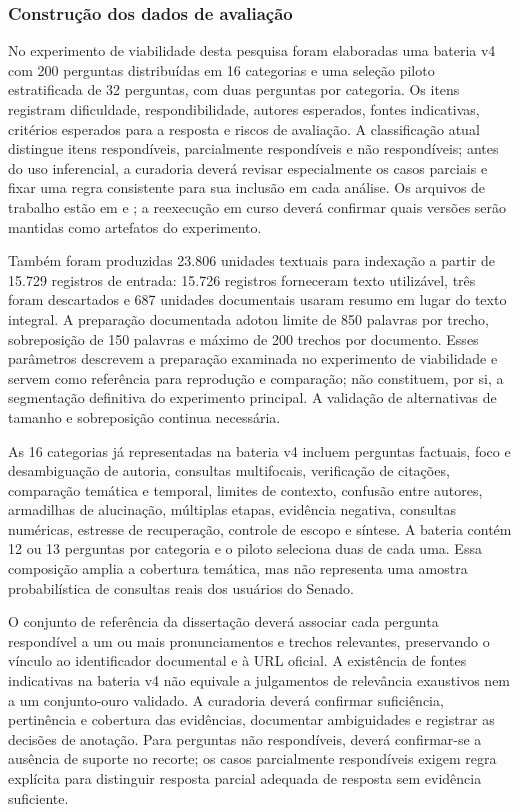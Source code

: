 \subsubsection{Construção dos dados de avaliação}

No experimento de viabilidade desta pesquisa foram elaboradas uma bateria v4 com 200 perguntas distribuídas em 16 categorias e uma seleção piloto estratificada de 32 perguntas, com duas perguntas por categoria. Os itens registram dificuldade, respondibilidade, autores esperados, fontes indicativas, critérios esperados para a resposta e riscos de avaliação. A classificação atual distingue itens respondíveis, parcialmente respondíveis e não respondíveis; antes do uso inferencial, a curadoria deverá revisar especialmente os casos parciais e fixar uma regra consistente para sua inclusão em cada análise. Os arquivos de trabalho estão em  e ; a reexecução em curso deverá confirmar quais versões serão mantidas como artefatos do experimento.

Também foram produzidas 23.806 unidades textuais para indexação a partir de 15.729 registros de entrada: 15.726 registros forneceram texto utilizável, três foram descartados e 687 unidades documentais usaram resumo em lugar do texto integral. A preparação documentada adotou limite de 850 palavras por trecho, sobreposição de 150 palavras e máximo de 200 trechos por documento. Esses parâmetros descrevem a preparação examinada no experimento de viabilidade e servem como referência para reprodução e comparação; não constituem, por si, a segmentação definitiva do experimento principal. A validação de alternativas de tamanho e sobreposição continua necessária.

As 16 categorias já representadas na bateria v4 incluem perguntas factuais, foco e desambiguação de autoria, consultas multifocais, verificação de citações, comparação temática e temporal, limites de contexto, confusão entre autores, armadilhas de alucinação, múltiplas etapas, evidência negativa, consultas numéricas, estresse de recuperação, controle de escopo e síntese. A bateria contém 12 ou 13 perguntas por categoria e o piloto seleciona duas de cada uma. Essa composição amplia a cobertura temática, mas não representa uma amostra probabilística de consultas reais dos usuários do Senado.

O conjunto de referência da dissertação deverá associar cada pergunta respondível a um ou mais pronunciamentos e trechos relevantes, preservando o vínculo ao identificador documental e à URL oficial. A existência de fontes indicativas na bateria v4 não equivale a julgamentos de relevância exaustivos nem a um conjunto-ouro validado. A curadoria deverá confirmar suficiência, pertinência e cobertura das evidências, documentar ambiguidades e registrar as decisões de anotação. Para perguntas não respondíveis, deverá confirmar-se a ausência de suporte no recorte; os casos parcialmente respondíveis exigem regra explícita para distinguir resposta parcial adequada de resposta sem evidência suficiente.

